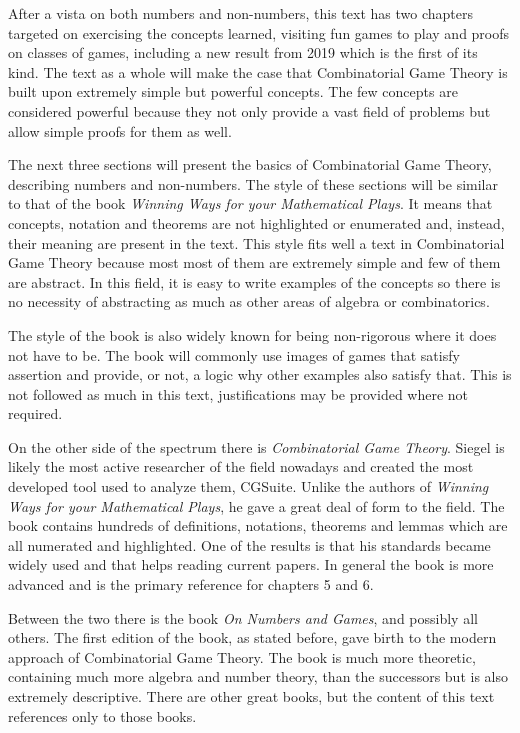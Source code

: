 After a vista on both numbers and non-numbers, this text has two chapters targeted on exercising the concepts learned, visiting fun games to play and proofs on classes of games, including a new result from 2019 which is the first of its kind. The text as a whole will make the case that Combinatorial Game Theory is built upon extremely simple but powerful concepts. The few concepts are considered powerful because they not only provide a vast field of problems but allow simple proofs for them as well.

The next three sections will present the basics of Combinatorial Game Theory, describing numbers and non-numbers. The style of these sections will be similar to that of the book \textit{Winning Ways for your Mathematical Plays}\cite{WW}. It means that concepts, notation and theorems are not highlighted or enumerated and, instead, their meaning are present in the text. This style fits well a text in Combinatorial Game Theory because most most of them are extremely simple and few of them are abstract. In this field, it is easy to write examples of the concepts so there is no necessity of abstracting as much as other areas of algebra or combinatorics.

The style of the book is also widely known for being non-rigorous where it does not have to be. The book will commonly use images of games that satisfy assertion and provide, or not, a logic why other examples also satisfy that. This is not followed as much in this text, justifications may be provided where not required. 

On the other side of the spectrum there is \textit{Combinatorial Game Theory}\cite{CGT}. Siegel is likely the most active researcher of the field nowadays and created the most developed tool used to analyze them, CGSuite. Unlike the authors of \textit{Winning Ways for your Mathematical Plays}, he gave a great deal of form to the field. The book contains hundreds of definitions, notations, theorems and lemmas which are all numerated and highlighted. One of the results is that his standards became widely used and that helps reading current papers. In general the book is more advanced and is the primary reference for chapters 5 and 6.

Between the two there is the book \textit{On Numbers and Games}\cite{ONAG1}\cite{ONAG2}, and possibly all others. The first edition of the book, as stated before, gave birth to the modern approach of Combinatorial Game Theory. The book is much more theoretic, containing much more algebra and number theory, than the successors but is also extremely descriptive. There are other great books, but the content of this text references only to those books.

